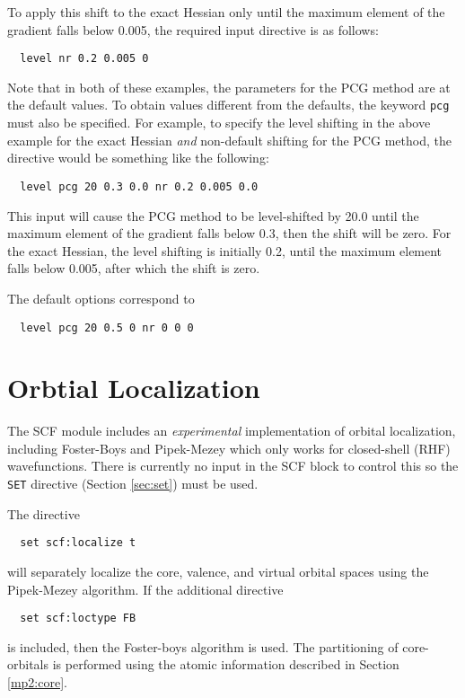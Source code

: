 To apply this shift to the exact Hessian only until the maximum
element of the gradient falls below 0.005, the required input
directive is as follows:
\begin{verbatim}
  level nr 0.2 0.005 0
\end{verbatim}

Note that in both of these examples, the parameters for the PCG method
are at the default values.  To obtain values different from the
defaults, the keyword \verb+pcg+ must also be specified.  For example,
to specify the level shifting in the above example for the exact
Hessian {\em and} non-default shifting for the PCG method, the
directive would be something like the following:
\begin{verbatim}
  level pcg 20 0.3 0.0 nr 0.2 0.005 0.0
\end{verbatim}

This input will cause the PCG method to be level-shifted by 20.0 until
the maximum element of the gradient falls below 0.3, then the shift
will be zero.  For the exact Hessian, the level shifting is initially
0.2, until the maximum element falls below 0.005, after which the
shift is zero. 

The default options correspond to
\begin{verbatim}
  level pcg 20 0.5 0 nr 0 0 0
\end{verbatim}

\section{Orbtial Localization}

The SCF module includes an {\em experimental} implementation of
orbital localization, including Foster-Boys and Pipek-Mezey which only
works for closed-shell (RHF) wavefunctions. There is currently no
input in the SCF block to control this so the \verb+SET+ directive
(Section \ref{sec:set}) must be used.

The directive
\begin{verbatim}
  set scf:localize t
\end{verbatim}
will separately localize the core, valence, and virtual orbital spaces
using the Pipek-Mezey algorithm.  If the additional directive
\begin{verbatim}
  set scf:loctype FB
\end{verbatim}
is included, then the Foster-boys algorithm is used.  The partitioning
of core-orbitals is performed using the atomic information described
in Section \ref{mp2:core}.

